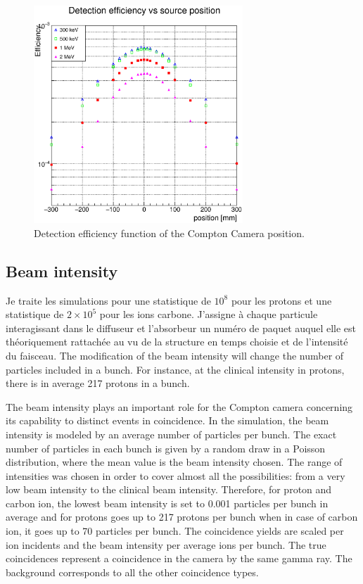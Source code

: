 \documentclass[12pt]{iopart}
\begin{document}
	\begin{figure} [!hbtp]	
	\centering
	\caption{Detection efficiency function of the Compton Camera position.}	
	\includegraphics[width=0.7\textwidth]{./Figure/Efficiency/2017-06-26_Efficiency_CC_articles.eps}
	\end{figure}


\subsection{Beam intensity \newline}
Je traite les simulations pour une statistique de $10^{8}$ pour les protons et une statistique de $2\times10^{5}$ pour les ions carbone.\newline
J'assigne à chaque particule interagissant dans le diffuseur et l'absorbeur un numéro de paquet auquel elle est théoriquement rattachée au vu de la structure en temps choisie et de l'intensité du faisceau.
The modification of the beam intensity will change the number of particles included in a bunch. For instance, at the clinical intensity in protons, there is in average 217 protons in a bunch.



The beam intensity plays an important role for the Compton camera concerning its capability to distinct events in coincidence. In the simulation, the beam intensity is modeled by an average number of particles per bunch. The exact number of particles in each bunch is given by a random draw in a Poisson distribution, where the mean value is the beam intensity chosen. The range of intensities was chosen in order to cover almost all the possibilities: from a very low beam intensity to the clinical beam intensity. Therefore, for proton and carbon ion, the lowest beam intensity is set to 0.001 particles per bunch in average and for protons goes up to 217 protons per bunch when in case of carbon ion, it goes up to 70 particles per bunch. The coincidence yields are scaled per ion incidents and the beam intensity per average ions per bunch. The true coincidences represent a coincidence in the camera by the same gamma ray. The background corresponds to all the other coincidence types.
\end{document}
